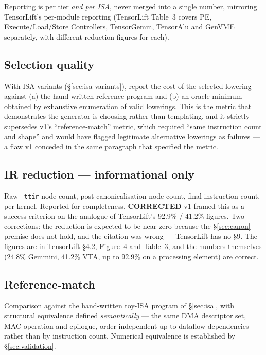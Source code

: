 \documentclass[11pt,a4paper]{article}
\newcommand{\code}[1]{\texttt{\small\hyphenchar\font=45 #1}}
\newcommand{\falsified}{\textbf{\textcolor{red!75!black}{CORRECTED}}}
\begin{document}
\noindent Reporting is per tier \emph{and per ISA}, never merged into a single number, mirroring TensorLift's
per-module reporting (TensorLift Table~3 covers PE, Execute/Load/Store Controllers, TensorGemm, TensorAlu and GenVME
separately, with different reduction figures for each).

\subsection{Selection quality}

With ISA variants (\S\ref{sec:isa-variants}), report the cost of the selected lowering against (a) the
hand-written reference program and (b) an oracle minimum obtained by exhaustive enumeration of valid
lowerings. This is the metric that demonstrates the generator is choosing rather than templating, and it
strictly supersedes v1's ``reference-match'' metric, which required ``same instruction count and shape'' and
would have flagged legitimate alternative lowerings as failures --- a flaw v1 conceded in the same paragraph
that specified the metric.

\subsection{IR reduction --- informational only}

Raw \code{ttir} node count, post-canonicalisation node count, final instruction count, per kernel. Reported
for completeness. \falsified{} v1 framed this as a success criterion on the analogue of TensorLift's 92.9\% /
41.2\% figures. Two corrections: the reduction is expected to be near zero because the \S\ref{sec:canon}
premise does not hold, and the citation was wrong --- TensorLift has no \S9. The figures are in TensorLift
\S4.2, Figure~4 and Table~3, and the numbers themselves (24.8\% Gemmini, 41.2\% VTA, up to 92.9\% on a
processing element) are correct.

\subsection{Reference-match}

Comparison against the hand-written toy-ISA program of \S\ref{sec:isa}, with structural equivalence defined
\emph{semantically} --- the same DMA descriptor set, MAC operation and epilogue, order-independent up to
dataflow dependencies --- rather than by instruction count. Numerical equivalence is established by
\S\ref{sec:validation}.
\end{document}
